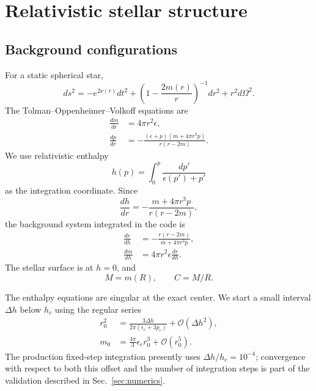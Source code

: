\section{Relativistic stellar structure}
\label{sec:stars}

\subsection{Background configurations}

For a static spherical star,
\begin{equation}
    ds^2
    =
    -e^{2\nu(r)}dt^2
    +
    \left(1-\frac{2m(r)}{r}\right)^{-1}dr^2
    +
    r^2d\Omega^2 .
\end{equation}
The Tolman--Oppenheimer--Volkoff equations are
\begin{align}
    \frac{dm}{dr}
    &=4\pi r^2\epsilon,
    \\
    \frac{dp}{dr}
    &=
    -\frac{(\epsilon+p)(m+4\pi r^3p)}
    {r(r-2m)} .
    \label{eq:tov}
\end{align}
We use relativistic enthalpy
\begin{equation}
    h(p)=\int_0^p\frac{dp'}{\epsilon(p')+p'}
    \label{eq:enthalpy}
\end{equation}
as the integration coordinate. Since
\begin{equation}
    \frac{dh}{dr}
    =
    -\frac{m+4\pi r^3p}{r(r-2m)},
\end{equation}
the background system integrated in the code is
\begin{align}
    \frac{dr}{dh}
    &=
    -\frac{r(r-2m)}{m+4\pi r^3p},
    \label{eq:drdh}
    \\
    \frac{dm}{dh}
    &=
    4\pi r^2\epsilon\frac{dr}{dh}.
    \label{eq:dmdh}
\end{align}
The stellar surface is at \(h=0\), and
\begin{equation}
    M=m(R),\qquad C=M/R.
\end{equation}

The enthalpy equations are singular at the exact center.  We start a small interval
\(\Delta h\) below \(h_c\) using the regular series
\begin{align}
    r_0^2
    &=
    \frac{3\Delta h}{2\pi(\epsilon_c+3p_c)}
    +\mathcal O(\Delta h^2),
    \\
    m_0
    &=
    \frac{4\pi}{3}\epsilon_c r_0^3
    +\mathcal O(r_0^5).
    \label{eq:center-series}
\end{align}
The production fixed-step integration presently uses
\(\Delta h/h_c=10^{-4}\); convergence with respect to both this offset and
the number of integration steps is part of the validation described in
Sec.~\ref{sec:numerics}.

